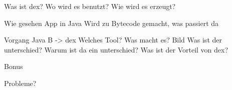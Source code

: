 Was ist dex?
Wo wird es benutzt?
Wie wird es erzeugt?

Wie gesehen App in Java
Wird zu Bytecode gemacht, was passiert da

Vorgang Java B -> dex
Welches Tool?
Was macht es? Bild
Was ist der unterschied? Warum ist da ein unterschied?
Was ist der Vorteil von dex?

Bonus

Probleme?
